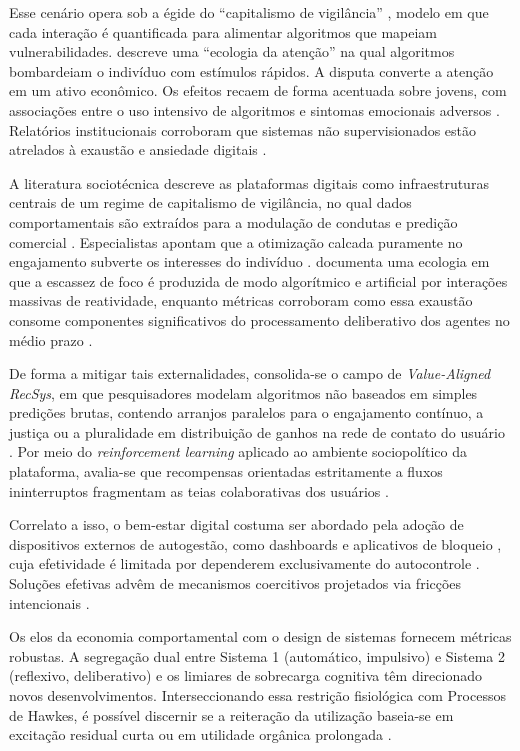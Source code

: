 \documentclass{sbc2023}
\begin{document}
Esse cenário opera sob a égide do ``capitalismo de vigilância'' \citep{zuboff2019}, modelo em que cada interação é quantificada para alimentar algoritmos que mapeiam vulnerabilidades. \citet{citton2017} descreve uma ``ecologia da atenção'' na qual algoritmos bombardeiam o indivíduo com estímulos rápidos. A disputa converte a atenção em um ativo econômico. Os efeitos recaem de forma acentuada sobre jovens, com associações entre o uso intensivo de algoritmos e sintomas emocionais adversos \citep{costello2023}. Relatórios institucionais corroboram que sistemas não supervisionados estão atrelados à exaustão e ansiedade digitais \citep{hai2021}.

A literatura sociotécnica descreve as plataformas digitais como infraestruturas centrais de um regime de capitalismo de vigilância, no qual dados comportamentais são extraídos para a modulação de condutas e predição comercial \citep{zuboff2019}. Especialistas apontam que a otimização calcada puramente no engajamento subverte os interesses do indivíduo \citep{harris2019}. \citet{citton2017} documenta uma ecologia em que a escassez de foco é produzida de modo algorítmico e artificial por interações massivas de reatividade, enquanto métricas corroboram como essa exaustão consome componentes significativos do processamento deliberativo dos agentes no médio prazo \citep{allcott2021}.

De forma a mitigar tais externalidades, consolida-se o campo de \textit{Value-Aligned RecSys}, em que pesquisadores modelam algoritmos não baseados em simples predições brutas, contendo arranjos paralelos para o engajamento contínuo, a justiça ou a pluralidade em distribuição de ganhos na rede de contato do usuário \citep{stray2021}. Por meio do \textit{reinforcement learning} aplicado ao ambiente sociopolítico da plataforma, avalia-se que recompensas orientadas estritamente a fluxos ininterruptos fragmentam as teias colaborativas dos usuários \citep{carvalho2023}.

Correlato a isso, o bem-estar digital costuma ser abordado pela adoção de dispositivos externos de autogestão, como dashboards e aplicativos de bloqueio \citep{forest, rescuetime}, cuja efetividade é limitada por dependerem exclusivamente do autocontrole \citep{lyngs2019}. Soluções efetivas advêm de mecanismos coercitivos projetados via fricções intencionais \citep{kushlev2022}.

Os elos da economia comportamental com o design de sistemas fornecem métricas robustas. A segregação dual entre Sistema 1 (automático, impulsivo) e Sistema 2 (reflexivo, deliberativo) \citep{kahneman2011} e os limiares de sobrecarga cognitiva \citep{paas2023} têm direcionado novos desenvolvimentos. Interseccionando essa restrição fisiológica com Processos de Hawkes, é possível discernir se a reiteração da utilização baseia-se em excitação residual curta ou em utilidade orgânica prolongada \citep{rizoiu2017, agarwal2024}.
\end{document}
